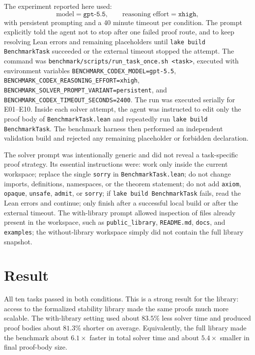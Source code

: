 \documentclass[10pt]{article}
\begin{document}
The experiment reported here used:
\[
\text{model}=\texttt{gpt-5.5}, \qquad
\text{reasoning effort}=\texttt{xhigh},
\]
with persistent prompting and a 40 minute timeout per condition.  The prompt
explicitly told the agent not to stop after one failed proof route, and to keep
resolving Lean errors and remaining placeholders until \texttt{lake build
BenchmarkTask} succeeded or the external timeout stopped the attempt.
The command was \texttt{benchmark/scripts/run\_task\_once.sh <task>}, executed
with environment variables
\texttt{BENCHMARK\_CODEX\_MODEL=gpt-5.5},
\texttt{BENCHMARK\_CODEX\_REASONING\_EFFORT=xhigh},
\texttt{BENCHMARK\_SOLVER\_PROMPT\_VARIANT=persistent}, and
\texttt{BENCHMARK\_CODEX\_TIMEOUT\_SECONDS=2400}.  The run was executed
serially for E01--E10.  Inside each solver attempt, the agent was instructed
to edit only the proof body of \texttt{BenchmarkTask.lean} and repeatedly run
\texttt{lake build BenchmarkTask}.  The benchmark harness then performed an
independent validation build and rejected any remaining placeholder or
forbidden declaration.

The solver prompt was intentionally generic and did not reveal a task-specific
proof strategy.  Its essential instructions were: work only inside the current
workspace; replace the single \texttt{sorry} in \texttt{BenchmarkTask.lean};
do not change imports, definitions, namespaces, or the theorem statement; do
not add \texttt{axiom}, \texttt{opaque}, \texttt{unsafe}, \texttt{admit}, or
\texttt{sorry}; if \texttt{lake build BenchmarkTask} fails, read the Lean
errors and continue; only finish after a successful local build or after the
external timeout.  The with-library prompt allowed inspection of files already
present in the workspace, such as \texttt{public\_library}, \texttt{README.md},
\texttt{docs}, and \texttt{examples}; the without-library workspace simply did
not contain the full library snapshot.

\section*{Result}

All ten tasks passed in both conditions.  This is a strong result for the
library: access to the formalized stability library made the same proofs much
more scalable.  The with-library setting used about \(83.5\%\) less solver
time and produced proof bodies about \(81.3\%\) shorter on average.
Equivalently, the full library made the benchmark about \(6.1\times\) faster
in total solver time and about \(5.4\times\) smaller in final proof-body size.
\end{document}
